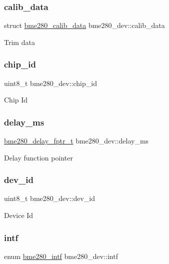 \subsubsection{\texorpdfstring{calib\+\_\+data}{calib\_data}}
{\footnotesize\ttfamily struct \hyperlink{structbme280__calib__data}{bme280\+\_\+calib\+\_\+data} bme280\+\_\+dev\+::calib\+\_\+data}

Trim data \mbox{\label{structbme280__dev_a6147bb3590bc7d1b02c41454d13c81c0}} 
\subsubsection{\texorpdfstring{chip\+\_\+id}{chip\_id}}
{\footnotesize\ttfamily uint8\+\_\+t bme280\+\_\+dev\+::chip\+\_\+id}

Chip Id \mbox{\label{structbme280__dev_a8f8957a3f4438239bd79b075691f0fd1}} 
\subsubsection{\texorpdfstring{delay\+\_\+ms}{delay\_ms}}
{\footnotesize\ttfamily \hyperlink{group___b_m_e280_gab2783d9a00e56ddc3e0e8d37b3462e34}{bme280\+\_\+delay\+\_\+fptr\+\_\+t} bme280\+\_\+dev\+::delay\+\_\+ms}

Delay function pointer \mbox{\label{structbme280__dev_a1f75cc7ecf84476a440ded0cd8c2fba7}} 
\subsubsection{\texorpdfstring{dev\+\_\+id}{dev\_id}}
{\footnotesize\ttfamily uint8\+\_\+t bme280\+\_\+dev\+::dev\+\_\+id}

Device Id \mbox{\label{structbme280__dev_a937b25397d1455117b64b1380368d30c}} 
\subsubsection{\texorpdfstring{intf}{intf}}
{\footnotesize\ttfamily enum \hyperlink{group___b_m_e280_ga142fcd9cb1e99b793488e9b3b1e6766e}{bme280\+\_\+intf} bme280\+\_\+dev\+::intf}

